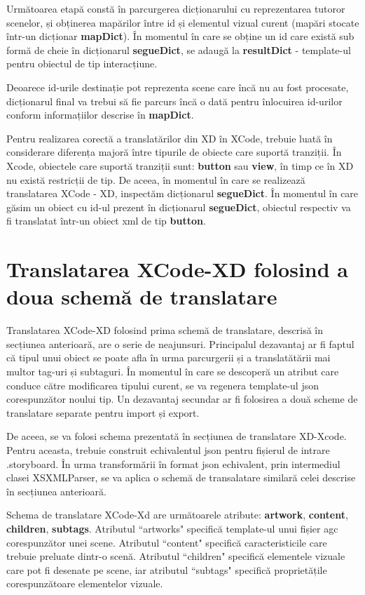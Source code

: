 Următoarea etapă constă în parcurgerea dicționarului cu reprezentarea tutoror scenelor, și obținerea mapărilor între id și elementul vizual curent (mapări stocate într-un dicționar \textbf{mapDict}). În momentul în care se obține un id care există sub formă de cheie în dicționarul \textbf{segueDict}, se adaugă la \textbf{resultDict} - template-ul pentru obiectul de tip interacțiune. 

Deoarece id-urile destinație pot reprezenta scene care încă nu au fost procesate, dicționarul final va trebui să fie parcurs încă o dată pentru înlocuirea id-urilor conform informațiilor descrise în \textbf{mapDict}.

Pentru realizarea corectă a translatărilor din XD în XCode, trebuie luată în considerare diferența majoră între tipurile de obiecte care suportă tranziții. În Xcode, obiectele care suportă tranziții sunt: \textbf{button} sau \textbf{view}, în timp ce în XD nu există restricții de tip. De aceea, în momentul în care se realizează translatarea XCode - XD, inspectăm dicționarul \textbf{segueDict}. În momentul în care găsim un obiect cu id-ul prezent în dicționarul \textbf{segueDict}, obiectul respectiv va fi translatat într-un obiect xml de tip \textbf{button}.

\section {Translatarea XCode-XD folosind a doua schemă de translatare} \label{xcxd2schema}

Translatarea XCode-XD folosind prima schemă de translatare, descrisă în secțiunea anterioară, are o serie de neajunsuri. Principalul dezavantaj ar fi faptul că tipul unui obiect se poate afla în urma parcurgerii și a translatătării mai multor tag-uri și subtaguri. În momentul în care se descoperă un atribut care conduce către modificarea tipului curent, se va regenera template-ul json corespunzător noului tip.  
Un dezavantaj secundar ar fi folosirea a două scheme de translatare separate pentru import și export.

De aceea, se va folosi schema prezentată în secțiunea de translatare XD-Xcode. Pentru aceasta, trebuie construit echivalentul json pentru fișierul de intrare .storyboard. În urma transformării în format json echivalent, prin intermediul clasei XSXMLParser, se va aplica o schemă de transalatare similară celei descrise în secțiunea anterioară.

Schema de translatare XCode-Xd are următoarele atribute: \textbf{artwork}, \textbf{content}, \textbf{children}, \textbf{subtags}. Atributul ``artworks" specifică template-ul unui fișier agc corespunzător unei scene. Atributul ``content" specifică caracteristicile care trebuie preluate dintr-o scenă. Atributul ``children" specifică elementele vizuale care pot fi desenate pe scene, iar atributul ``subtags" specifică proprietățile corespunzătoare elementelor vizuale.

